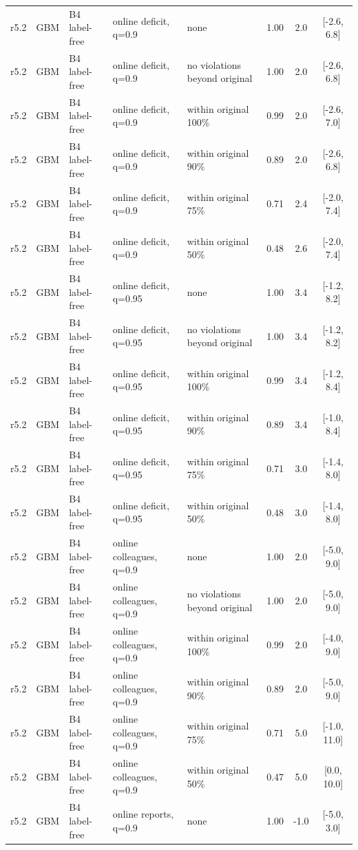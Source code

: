 \begin{longtable}{lllp{4.2cm}p{3.4cm}ccc}
r5.2 & GBM & B4 label-free & online deficit, q=0.9 & none & 1.00 & 2.0 & [-2.6, 6.8] \\
r5.2 & GBM & B4 label-free & online deficit, q=0.9 & no violations beyond original & 1.00 & 2.0 & [-2.6, 6.8] \\
r5.2 & GBM & B4 label-free & online deficit, q=0.9 & within original 100\% & 0.99 & 2.0 & [-2.6, 7.0] \\
r5.2 & GBM & B4 label-free & online deficit, q=0.9 & within original 90\% & 0.89 & 2.0 & [-2.6, 6.8] \\
r5.2 & GBM & B4 label-free & online deficit, q=0.9 & within original 75\% & 0.71 & 2.4 & [-2.0, 7.4] \\
r5.2 & GBM & B4 label-free & online deficit, q=0.9 & within original 50\% & 0.48 & 2.6 & [-2.0, 7.4] \\
r5.2 & GBM & B4 label-free & online deficit, q=0.95 & none & 1.00 & 3.4 & [-1.2, 8.2] \\
r5.2 & GBM & B4 label-free & online deficit, q=0.95 & no violations beyond original & 1.00 & 3.4 & [-1.2, 8.2] \\
r5.2 & GBM & B4 label-free & online deficit, q=0.95 & within original 100\% & 0.99 & 3.4 & [-1.2, 8.4] \\
r5.2 & GBM & B4 label-free & online deficit, q=0.95 & within original 90\% & 0.89 & 3.4 & [-1.0, 8.4] \\
r5.2 & GBM & B4 label-free & online deficit, q=0.95 & within original 75\% & 0.71 & 3.0 & [-1.4, 8.0] \\
r5.2 & GBM & B4 label-free & online deficit, q=0.95 & within original 50\% & 0.48 & 3.0 & [-1.4, 8.0] \\
r5.2 & GBM & B4 label-free & online colleagues, q=0.9 & none & 1.00 & 2.0 & [-5.0, 9.0] \\
r5.2 & GBM & B4 label-free & online colleagues, q=0.9 & no violations beyond original & 1.00 & 2.0 & [-5.0, 9.0] \\
r5.2 & GBM & B4 label-free & online colleagues, q=0.9 & within original 100\% & 0.99 & 2.0 & [-4.0, 9.0] \\
r5.2 & GBM & B4 label-free & online colleagues, q=0.9 & within original 90\% & 0.89 & 2.0 & [-5.0, 9.0] \\
r5.2 & GBM & B4 label-free & online colleagues, q=0.9 & within original 75\% & 0.71 & 5.0 & [-1.0, 11.0] \\
r5.2 & GBM & B4 label-free & online colleagues, q=0.9 & within original 50\% & 0.47 & 5.0 & [0.0, 10.0] \\
r5.2 & GBM & B4 label-free & online reports, q=0.9 & none & 1.00 & -1.0 & [-5.0, 3.0] \\

\end{longtable}
